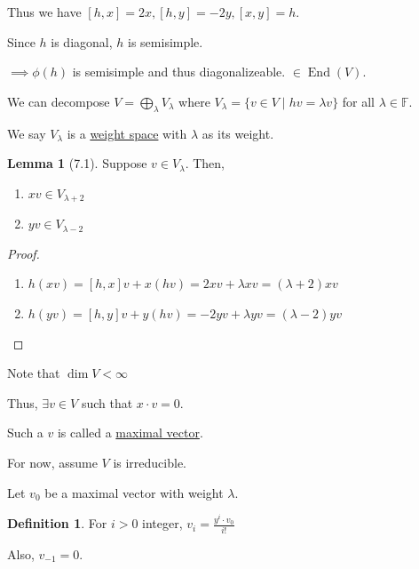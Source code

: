 \documentclass{article}
\theoremstyle{definition}
\newtheorem*{definition}{Definition}
\newtheorem{lemma}[theorem]{Lemma}
\newcommand{\End}{\operatorname{End}}
\begin{document}
Thus we have \([h,x] = 2x, [h,y]=-2y, [x,y]=h\). 

Since \(h\) is diagonal, \(h\) is semisimple.

\(\implies \phi(h)\) is semisimple and thus diagonalizeable. \(\in \End(V)\). 

We can decompose \(V = \bigoplus_{\lambda} V_\lambda\) where \(V_\lambda = \{ v\in V \mid h v = \lambda v \} \) for all \(\lambda \in \mathbb{F}\). 

We say \(V_\lambda\) is a \underline{weight space} with \(\lambda\) as its weight.

\begin{lemma}
    [7.1] Suppose \(v\in V_\lambda\). Then,

    \begin{enumerate}[label=\arabic*)]
        \item \(xv \in V_{\lambda+2}\)
        \item \(yv \in V_{\lambda-2}\) 
    \end{enumerate} 
\end{lemma}

\begin{proof}
    \begin{enumerate}[label=\arabic*)]
        \item \(h(xv) = [h,x]v + x(hv) = 2xv + \lambda xv = (\lambda + 2)xv\)
        \item \(h(yv) = [h,y]v + y(hv) = -2yv + \lambda yv = (\lambda - 2)yv\)  
    \end{enumerate} 
\end{proof}

\begin{center}
\end{center}

Note that \(\dim V < \infty\)

Thus, \(\exists v \in V\) such that \(x\cdot v = 0\).

Such a \(v\) is called a \underline{maximal vector}. 

For now, assume \(V\) is irreducible.

Let \(v_0\) be a maximal vector with weight \(\lambda\).

\begin{definition}
    For \(i > 0\) integer, \(v_i = \frac{y^i\cdot v_0}{i!}\) 

    Also, \(v_{-1}=0\).
\end{definition}
\end{document}
